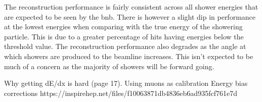 The reconstruction performance is fairly consistent across all shower energies that are expected to be seen by the \gls{bnb}. There is however a slight dip in performance at the lowest energies when comparing with the true energy of the showering particle. This is due to a greater percentage of hits having energies below the threshold value. The reconstruction performance also degrades as the angle at which showers are produced to the beamline increases. This isn't expected to be much of a concern as the majority of showers will be forward going. 




Why getting dE/dx is hard (page 17).
Using muons as calibration
Energy bias corrections
https://inspirehep.net/files/f10063871db4836eb6ad935fcf761e7d


